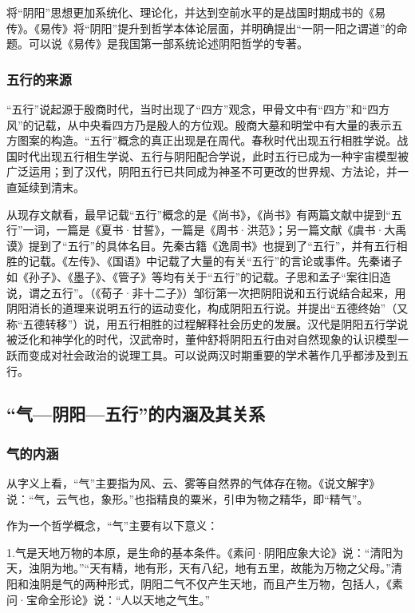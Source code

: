 \documentclass[draft,12pt]{ctexbook}
\begin{document}
将“阴阳”思想更加系统化、理论化，并达到空前水平的是战国时期成书的《易传》。《易传》将“阴阳”提升到哲学本体论层面，并明确提出“一阴一阳之谓道”的命题。可以说《易传》是我国第一部系统论述阴阳哲学的专著。

\subsubsection{五行的来源}%

“五行”说起源于殷商时代，当时出现了“四方”观念，甲骨文中有“四方”和“四方风”的记载，从中央看四方乃是殷人的方位观。殷商大墓和明堂中有大量的表示五方图案的构造。“五行”概念的真正出现是在周代。春秋时代出现五行相胜学说。战国时代出现五行相生学说、五行与阴阳配合学说，此时五行已成为一种宇宙模型被广泛运用；到了汉代，阴阳五行已共同成为神圣不可更改的世界规、方法论，并一直延续到清末。

从现存文献看，最早记载“五行”概念的是《尚书》，《尚书》有两篇文献中提到“五行”一词，一篇是《夏书·甘誓》，一篇是《周书·洪范》；另一篇文献《虞书·大禹谟》提到了“五行”的具体名目。先秦古籍《逸周书》也提到了“五行”，并有五行相胜的记载。《左传》、《国语》中记载了大量的有关“五行”的言论或事件。先秦诸子如《孙子》、《墨子》、《管子》等均有关于“五行”的记载。子思和孟子“案往旧造说，谓之五行”。（《荀子·非十二子》）邹衍第一次把阴阳说和五行说结合起来，用阴阳消长的道理来说明五行的运动变化，构成阴阳五行说。并提出“五德终始”（又称“五德转移”）说，用五行相胜的过程解释社会历史的发展。汉代是阴阳五行学说被泛化和神学化的时代，汉武帝时，董仲舒将阴阳五行由对自然现象的认识模型一跃而变成对社会政治的说理工具。可以说两汉时期重要的学术著作几乎都涉及到五行。

\subsection{“气—阴阳—五行”的内涵及其关系}%

\subsubsection{气的内涵}%

从字义上看，“气”主要指为风、云、雾等自然界的气体存在物。《说文解字》说：“气，云气也，象形。”也指精良的粟米，引申为物之精华，即“精气”。

作为一个哲学概念，“气”主要有以下意义：

1.气是天地万物的本原，是生命的基本条件。《素问·阴阳应象大论》说：“清阳为天，浊阴为地。”“天有精，地有形，天有八纪，地有五里，故能为万物之父母。”清阳和浊阴是气的两种形式，阴阳二气不仅产生天地，而且产生万物，包括人，《素问·宝命全形论》说：“人以天地之气生。”
\end{document}
